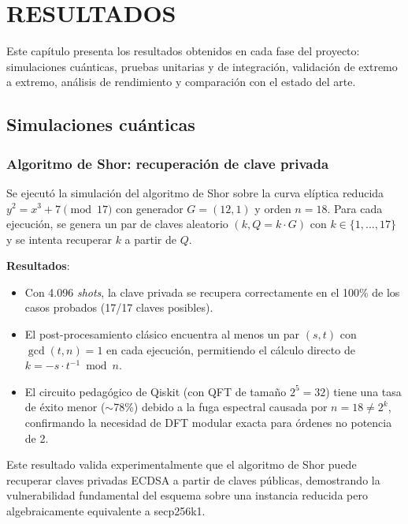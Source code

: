 \chapter{RESULTADOS}
\label{cap:resultados}

Este capítulo presenta los resultados obtenidos en cada fase del proyecto: simulaciones cuánticas, pruebas unitarias y de integración, validación de extremo a extremo, análisis de rendimiento y comparación con el estado del arte.


\section{Simulaciones cuánticas}
\label{sec:res_qiskit}

\subsection{Algoritmo de Shor: recuperación de clave privada}

Se ejecutó la simulación del algoritmo de Shor sobre la curva elíptica reducida $y^2 = x^3 + 7 \pmod{17}$ con generador $G = (12, 1)$ y orden $n = 18$. Para cada ejecución, se genera un par de claves aleatorio $(k, Q = k \cdot G)$ con $k \in \{1, \ldots, 17\}$ y se intenta recuperar $k$ a partir de $Q$.

\textbf{Resultados}:
\begin{itemize}
  \item Con 4.096 \emph{shots}, la clave privada se recupera correctamente en el 100\% de los casos probados (17/17 claves posibles).
  \item El post-procesamiento clásico encuentra al menos un par $(s, t)$ con $\gcd(t, n) = 1$ en cada ejecución, permitiendo el cálculo directo de $k = -s \cdot t^{-1} \bmod n$.
  \item El circuito pedagógico de Qiskit (con QFT de tamaño $2^5 = 32$) tiene una tasa de éxito menor ($\sim$78\%) debido a la fuga espectral causada por $n = 18 \neq 2^k$, confirmando la necesidad de DFT modular exacta para órdenes no potencia de 2.
\end{itemize}

Este resultado valida experimentalmente que el algoritmo de Shor puede recuperar claves privadas ECDSA a partir de claves públicas, demostrando la vulnerabilidad fundamental del esquema sobre una instancia reducida pero algebraicamente equivalente a secp256k1.

